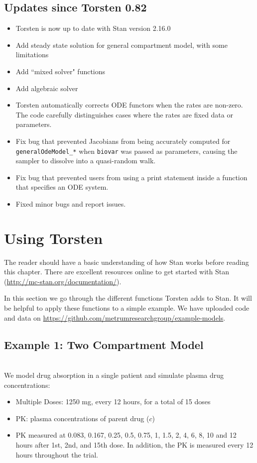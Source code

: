 \documentclass[11pt]{amsart}
\begin{document}
\subsection{Updates since Torsten 0.82}
\begin{itemize}
  \item Torsten is now up to date with Stan version 2.16.0
  \item Add steady state solution for general compartment model, with some limitations
  \item Add ``mixed solver" functions
  \item Add algebraic solver
  \item Torsten automatically corrects ODE functors when the rates are non-zero. The code carefully distinguishes cases where the rates are fixed data or parameters. 
  \item Fix bug that prevented Jacobians from being accurately computed for \texttt{generalOdeModel\_*} when \texttt{biovar} was passed as parameters, causing the sampler to dissolve into a quasi-random walk.
  \item Fix bug that prevented users from using a print statement inside a function that specifies an ODE system.
  \item Fixed minor bugs and report issues.
\end{itemize}

\clearpage 

\section{Using Torsten}

The reader should have a basic understanding of how Stan works before reading this chapter. There are excellent resources online to get started with Stan (\url{http://mc-stan.org/documentation/}). 

In this section we go through the different functions Torsten adds to Stan. It will be helpful to apply these functions to a simple example. We have uploaded code and data on \url{https://github.com/metrumresearchgroup/example-models}.

\subsection{Example 1: Two Compartment Model} \ \\

We model drug absorption in a single patient and simulate plasma drug concentrations:
\begin{itemize}
  \item Multiple Doses: 1250 mg, every 12 hours, for a total of 15 doses
  \item PK: plasma concentrations of parent drug ($c$)
  \item PK measured at 0.083, 0.167, 0.25, 0.5, 0.75, 1, 1.5, 2, 4, 6, 8, 10 and 12 hours after 1st, 2nd, and 15th dose. In addition, the PK is measured every 12 hours throughout the trial.
\end{itemize}
\end{document}
